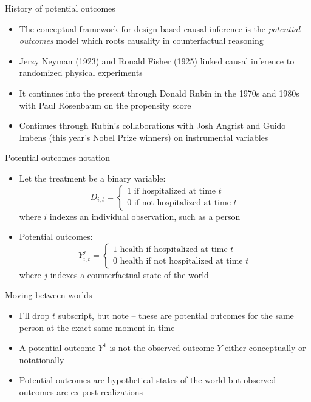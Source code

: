 \documentclass{beamer}
\begin{document}
\begin{frame}{History of potential outcomes}

  \begin{itemize}
    \item The conceptual framework for design based causal inference is the \emph{potential outcomes} model which roots causality in counterfactual reasoning
    \item Jerzy Neyman (1923) and Ronald Fisher (1925) linked causal inference to randomized physical experiments
    \item It continues into the present through Donald Rubin in the 1970s and 1980s with Paul Rosenbaum on the propensity score
    \item Continues through Rubin's collaborations with Josh Angrist and Guido Imbens (this year's Nobel Prize winners) on instrumental variables
  \end{itemize}

\end{frame}


\begin{frame}{Potential outcomes notation}

  \begin{itemize}
    \item Let the treatment be a binary variable: $$D_{i,t} =\begin{cases} 1 \text{ if hospitalized at time $t$} \\ 0 \text{ if not hospitalized at time $t$} \end{cases}$$where $i$ indexes an individual observation, such as a person
    \item Potential outcomes: $$Y_{i,t}^j =\begin{cases} 1 \text{ health if hospitalized at time $t$} \\ 0 \text{ health if not hospitalized at time $t$} \end{cases}$$where $j$ indexes a counterfactual state of the world
  \end{itemize}
\end{frame}

\begin{frame}{Moving between worlds}

  \begin{itemize}
    \item I'll drop $t$ subscript, but note -- these are potential outcomes for the same person at the exact same moment in time
    \item A potential outcome $Y^1$ is not the observed outcome $Y$ either conceptually or notationally
    \item Potential outcomes are hypothetical states of the world but observed outcomes are ex post realizations
  \end{itemize}
\end{frame}
\end{document}
